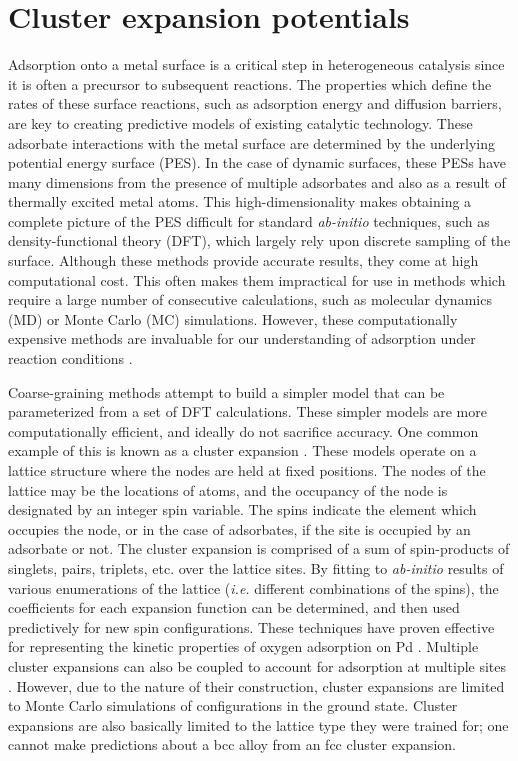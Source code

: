 \documentclass[12pt]{cmuthesis}
\begin{document}
\section{Cluster expansion potentials}
\label{sec:org85a3f66}
Adsorption onto a metal surface is a critical step in heterogeneous catalysis since it is often a precursor to subsequent reactions. The properties which define the rates of these surface reactions, such as adsorption energy and diffusion barriers, are key to creating predictive models of existing catalytic technology. These adsorbate interactions with the metal surface are determined by the underlying potential energy surface (PES). In the case of dynamic surfaces, these PESs have many dimensions from the presence of multiple adsorbates and also as a result of thermally excited metal atoms. This high-dimensionality makes obtaining a complete picture of the PES difficult for standard \emph{ab-initio} techniques, such as density-functional theory (DFT), which largely rely upon discrete sampling of the surface. Although these methods provide accurate results, they come at high computational cost. This often makes them impractical for use in methods which require a large number of consecutive calculations, such as molecular dynamics (MD) or Monte Carlo (MC) simulations. However, these computationally expensive methods are invaluable for our understanding of adsorption under reaction conditions \cite{rogal-2007-ab-initio,shi-2007-first-princ}.

Coarse-graining methods attempt to build a simpler model that can be parameterized from a set of DFT calculations. These simpler models are more computationally efficient, and ideally do not sacrifice accuracy. One common example of this is known as a cluster expansion \cite{sanchez-1984-gener-clust,shi-2007-first-princ,miller-2013-simul-temper}. These models operate on a lattice structure where the nodes are held at fixed positions. The nodes of the lattice may be the locations of atoms, and the occupancy of the node is designated by an integer spin variable. The spins indicate the element which occupies the node, or in the case of adsorbates, if the site is occupied by an adsorbate or not. The cluster expansion is comprised of a sum of spin-products of singlets, pairs, triplets, etc. over the lattice sites. By fitting to \emph{ab-initio} results of various enumerations of the lattice (\emph{i.e.} different combinations of the spins), the coefficients for each expansion function can be determined, and then used predictively for new spin configurations. These techniques have proven effective for representing the kinetic properties of oxygen adsorption on Pd \cite{frey-2014-implic-cover}. Multiple cluster expansions can also be coupled to account for adsorption at multiple sites \cite{han-2005-surfac-segreg,chen-2011-order-oxygen}. However, due to the nature of their construction, cluster expansions are limited to Monte Carlo simulations of configurations in the ground state. Cluster expansions are also basically limited to the lattice type they were trained for; one cannot make predictions about a bcc alloy from an fcc cluster expansion.
\end{document}
